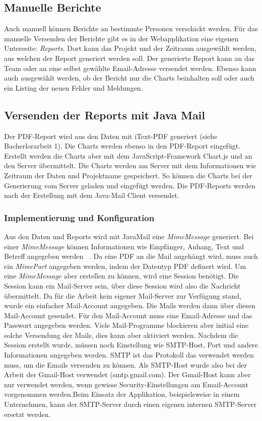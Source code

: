 \subsection{Manuelle Berichte}
Auch manuell können Berichte an bestimmte Personen verschickt werden. Für das manuelle Versenden der Berichte gibt es in der Webapplikation eine eigenen Unterseite: \textit{Reports}. Dort kann das Projekt und der Zeitraum ausgewählt werden, aus welchen der Report generiert werden soll. Der generierte Report kann an das Team oder an eine selbst gewählte Email-Adresse versendet werden. Ebenso kann auch ausgewählt werden, ob der Bericht nur die Charts beinhalten soll oder auch ein Listing der neuen Fehler und Meldungen.
\subsection{Versenden der Reports mit Java Mail}
Der PDF-Report wird aus den Daten mit iText-PDF generiert (siehe Bacherlorarbeit 1). Die Charts werden ebenso in den PDF-Report eingefügt. Erstellt werden die Charts aber mit dem JavaScript-Framework Chart.js und an den Server übermittelt. Die Charts werden am Server mit dem Informationen wie Zeitraum der Daten und Projektname gespeichert. So können die Charts bei der Generierung vom Server geladen und eingefügt werden. Die PDF-Reports werden nach der Erstellung mit dem Java-Mail Client versendet. 
\subsubsection{Implementierung und Konfiguration} 
Aus den Daten und Reports wird mit JavaMail eine \textit{MimeMessage} generiert. Bei einer \textit{MimeMessage} können Informationen wie Empfänger, Anhang, Text und Betreff angegeben werden ~\parencite{harold2013javamail}. Da eine PDF an die Mail angehängt wird, muss auch ein \textit{MimePart} angegeben werden, indem der Datentyp PDF definert wird. Um eine \textit{MimeMessage} aber erstellen zu können, wird eine Session benötigt. Die Session kann ein Mail-Server sein, über diese Session wird also die Nachricht übermittelt. Da für die Arbeit kein eigener Mail-Server zur Verfügung stand, wurde ein einfacher Mail-Account angegeben. Die Mails werden dann über diesen Mail-Account gesendet. Für den Mail-Account muss eine Email-Adresse und das Passwort angegeben werden. Viele Mail-Programme blockieren aber initial eine solche Versendung der Mails, dies kann aber aktiviert werden. Nachdem die Session erstellt wurde, müssen noch Einstellung wie SMTP-Host, Port und andere Informationen angegeben werden. SMTP ist das Protokoll das verwendet werden muss, um die Emails versenden zu können. Als SMTP-Host wurde also bei der Arbeit der Gmail-Host verwendet (smtp.gmail.com). Der Gmail-Host kann aber nur verwendet werden, wenn gewisse Security-Einstellungen am Email-Account vorgenommen werden.Beim Einsatz der Applikation, beispielsweise in einem Unternehmen, kann der SMTP-Server durch einen eigenen internen SMTP-Server ersetzt werden.
